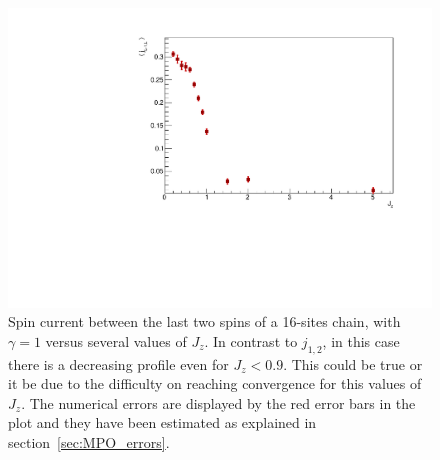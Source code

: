 \begin{figure}[H]
    \centering
    \captionsetup{width=1.\linewidth}
    \includegraphics[scale=0.6]{Figures/SpinCurrVSJzLth.pdf}
    \caption{Spin current between the last two spins of a 16-sites chain, with $\gamma=1$ versus several values of $J_z$. In contrast to $j_{1,2}$, in this case there is a decreasing profile even for $J_z < 0.9$. This could be true or it be due to the difficulty on reaching convergence for this values of $J_z$. The numerical errors are displayed by the red error bars in the plot and they have been estimated as explained in section~\ref{sec:MPO_errors}.}
    \label{fig:SpinCurrVSJzLth}
\end{figure}